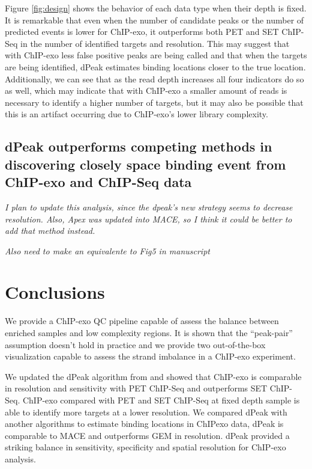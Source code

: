 \documentclass{bmcart}\usepackage[]{graphicx}\usepackage[]{color}
\begin{document}
Figure \ref{fig:design} shows the behavior of each data type when
their depth is fixed. It is remarkable that even when the number of
candidate peaks or the number of predicted events is lower for
ChIP-exo, it outperforms both PET and SET ChIP-Seq in the number of
identified targets and resolution. This may suggest that with ChIP-exo
less false positive peaks are being called and that when the targets
are being identified, dPeak estimates binding locations closer to the
true location. Additionally, we can see that as the read depth
increases all four indicators do so as well, which may indicate that
with ChIP-exo a smaller amount of reads is necessary to identify a
higher number of targets, but it may also be possible that this is an
artifact occurring due to ChIP-exo's lower library complexity.


\subsection{dPeak outperforms competing methods in discovering closely
  space binding event from ChIP-exo and ChIP-Seq data}
\label{sec:dpeak_comp}

\emph{I plan to update this analysis, since the dpeak's new strategy
  seems to decrease resolution. Also, Apex was updated into MACE, so I
  think it could be better to add that method instead.}

\emph{Also need to make an equivalente to Fig5 in manuscript}

\section{Conclusions}
\label{sec:conclusions}

We provide a ChIP-exo QC pipeline capable of assess the balance between
enriched samples and low complexity regions. It is shown that the
``peak-pair'' assumption doesn't hold in practice and we provide two
out-of-the-box visualization capable to assess the strand imbalance in
a ChIP-exo experiment.

We updated the dPeak algorithm from \cite{dpeak} and showed that
ChIP-exo is comparable in resolution and sensitivity with PET ChIP-Seq
and outperforms SET ChIP-Seq. ChIP-exo compared with PET and SET
ChIP-Seq at fixed depth sample is able to identify more targets at a
lower resolution. We compared dPeak with another algorithms to
estimate binding locations in ChIPexo data, dPeak is comparable to
MACE and outperforms GEM in resolution. dPeak provided a striking
balance in sensitivity, specificity and spatial resolution for
ChIP-exo analysis.
\end{document}
